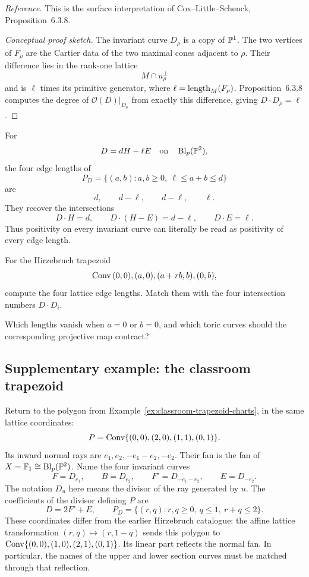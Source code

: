 \noindent
\textit{Reference.}
This is the surface interpretation of Cox--Little--Schenck,
Proposition~6.3.8.

\begin{proof}[Conceptual proof sketch]
The invariant curve \(D_\rho\) is a copy of \(\PP^1\). The two
vertices of \(F_\rho\) are the Cartier data of the two maximal cones
adjacent to \(\rho\). Their difference lies in the rank-one lattice
\[
M\cap u_\rho^\perp
\]
and is \(\ell\) times its primitive generator, where
\(\ell=\length_M(F_\rho)\). Proposition~6.3.8 computes the degree of
\(\mathcal O(D)|_{D_\rho}\) from exactly this difference, giving
\(D\cdot D_\rho=\ell\).
\end{proof}

For
\[
D=dH-\ell E
\quad\text{on}\quad
\Blp{\PP^2}{p},
\]
the four edge lengths of
\[
P_D=
\{(a,b):a,b\geq0,\ \ell\leq a+b\leq d\}
\]
are
\[
d,
\qquad
d-\ell,
\qquad
d-\ell,
\qquad\ell.
\]
They recover the intersections
\[
D\cdot H=d,
\qquad
D\cdot(H-E)=d-\ell,
\qquad
D\cdot E=\ell.
\]
Thus positivity on every invariant curve can literally be read as
positivity of every edge length.

\begin{surfacelaboratory}
For the Hirzebruch trapezoid
\[
\Conv{(0,0),(a,0),(a+rb,b),(0,b)},
\]
compute the four lattice edge lengths. Match them with the four
intersection numbers \(D\cdot D_i\).

Which lengths vanish when \(a=0\) or \(b=0\), and which toric curves
should the corresponding projective map contract?
\end{surfacelaboratory}

\subsection{Supplementary example: the classroom trapezoid}
\label{subsec:classroom-oct19-hirzebruch-restriction}

Return to the polygon from Example~\ref{ex:classroom-trapezoid-charts}, in
the same lattice coordinates:
\[
P=\Conv\{(0,0),(2,0),(1,1),(0,1)\}.
\]
Its inward normal rays are \(e_1,e_2,-e_1-e_2,-e_2\). Their fan is
the fan of \(X=\Hirz{1}\cong\Blp{\PP^2}{p}\). Name the four
invariant curves
\[
F=D_{e_1},\qquad B=D_{e_2},\qquad
F'=D_{-e_1-e_2},\qquad E=D_{-e_2}.
\]
The notation \(D_u\) here means the divisor of the ray generated by
\(u\). The coefficients of the divisor defining \(P\) are
\[
D=2F'+E,\qquad
P_D=\{(r,q):r,q\geq0,\ q\leq1,\ r+q\leq2\}.
\]
These coordinates differ from the earlier Hirzebruch catalogue:
the affine lattice transformation \((r,q)\mapsto(r,1-q)\) sends
this polygon to \(\Conv\{(0,0),(1,0),(2,1),(0,1)\}\).
Its linear part reflects the normal fan. In particular, the names
of the upper and lower section curves must be matched through that
reflection.

